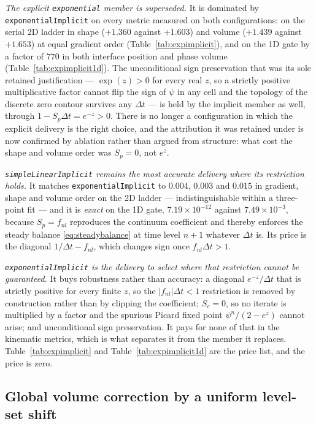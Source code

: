 \documentclass[preprint,3p,11pt]{elsarticle}
\newcommand{\psilev}{\psi}
\begin{document}
\emph{The explicit \texttt{exponential} member is superseded.} It is dominated by
\texttt{exponentialImplicit} on every metric measured on both configurations: on
the serial 2D ladder in shape ($+1.360$ against $+1.603$) and volume ($+1.439$
against $+1.653$) at equal gradient order (Table~\ref{tab:expimplicit}), and on
the 1D gate by a factor of $770$ in both interface position and phase volume
(Table~\ref{tab:expimplicit1d}). The unconditional sign preservation that was its
sole retained justification --- $\exp(z) > 0$ for every real $z$, so a strictly
positive multiplicative factor cannot flip the sign of $\psilev$ in any cell and
the topology of the discrete zero contour survives any $\Delta t$ --- is held by
the implicit member as well, through $1 - S_p\Delta t = e^{-z} > 0$. There is no
longer a configuration in which the explicit delivery is the right choice, and the
attribution it was retained under is now confirmed by ablation rather than argued
from structure: what cost the shape and volume order was $S_p = 0$, not $e^{z}$.

\emph{\texttt{simpleLinearImplicit} remains the most accurate delivery where its
restriction holds.} It matches \texttt{exponentialImplicit} to $0.004$, $0.003$ and
$0.015$ in gradient, shape and volume order on the 2D ladder --- indistinguishable
within a three-point fit --- and it is \emph{exact} on the 1D gate,
$7.19\times10^{-12}$ against $7.49\times10^{-3}$, because $S_p = f_{nl}$ reproduces
the continuum coefficient and thereby enforces the steady balance
\eqref{eq:steadybalance} at time level $n+1$ whatever $\Delta t$ is. Its price is
the diagonal $1/\Delta t - f_{nl}$, which changes sign once $f_{nl}\Delta t > 1$.

\emph{\texttt{exponentialImplicit} is the delivery to select where that restriction
cannot be guaranteed.} It buys robustness rather than accuracy: a diagonal
$e^{-z}/\Delta t$ that is strictly positive for every finite $z$, so the
$|f_{nl}|\Delta t < 1$ restriction is removed by construction rather than by
clipping the coefficient; $S_c = 0$, so no iterate is multiplied by a factor and the
spurious Picard fixed point $\psilev^n/(2-e^{z})$ cannot arise; and unconditional
sign preservation. It pays for none of that in the kinematic metrics, which is what
separates it from the member it replaces. Table~\ref{tab:expimplicit} and
Table~\ref{tab:expimplicit1d} are the price list, and the price is zero.

\subsection{Global volume correction by a uniform level-set shift}
\label{sec:volcorr}
\end{document}
